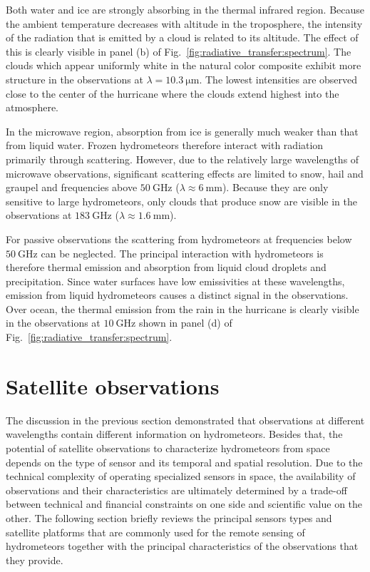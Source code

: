 Both water and ice are strongly absorbing in the thermal infrared region.
Because the ambient temperature decreases with altitude in the troposphere, the
intensity of the radiation that is emitted by a cloud is related to its
altitude. The effect of this is clearly visible in panel (b) of
Fig.~\ref{fig:radiative_transfer:spectrum}. The clouds which appear uniformly
white in the natural color composite exhibit more structure in the observations
at $\lambda=\SI{10.3}{\micro \meter}$. The lowest intensities are observed close
to the center of the hurricane where the clouds extend highest into the
atmosphere.

In the microwave region, absorption from ice is generally much weaker than that
from liquid water. Frozen hydrometeors therefore interact with radiation
primarily through scattering. However, due to the relatively large wavelengths
of microwave observations, significant scattering effects are limited to snow,
hail and graupel and frequencies above $\SI{50}{\giga \hertz}$
($\lambda \approx \SI{6}{\milli \meter}$). Because they are only sensitive to
large hydrometeors, only clouds that produce snow are visible in the
observations at $\SI{183}{\giga \hertz}$
($\lambda \approx \SI{1.6}{\milli \meter}$).

For passive observations the scattering from hydrometeors at frequencies below
$\SI{50}{\giga \hertz}$ can be neglected. The principal interaction with
hydrometeors is therefore thermal emission and absorption from liquid cloud
droplets and precipitation. Since water surfaces have low emissivities at these
wavelengths, emission from liquid hydrometeors causes a distinct signal in the
observations. Over ocean, the thermal emission from the rain in the hurricane is
clearly visible in the observations at $\SI{10}{\giga \hertz}$  shown in
panel (d) of Fig.~\ref{fig:radiative_transfer:spectrum}.

\section{Satellite observations}

The discussion in the previous section demonstrated that observations at
different wavelengths contain different information on hydrometeors. Besides
that, the potential of satellite observations to characterize hydrometeors
from space depends on the type of sensor and its temporal and spatial
resolution. Due to the technical complexity of operating specialized sensors in
space, the availability of observations and their characteristics are ultimately
determined by a trade-off between technical and financial constraints on one
side and scientific value on the other. The following section briefly reviews
the principal sensors types and satellite platforms that are commonly used for
the remote sensing of hydrometeors together with the principal characteristics of
the observations that they provide.

